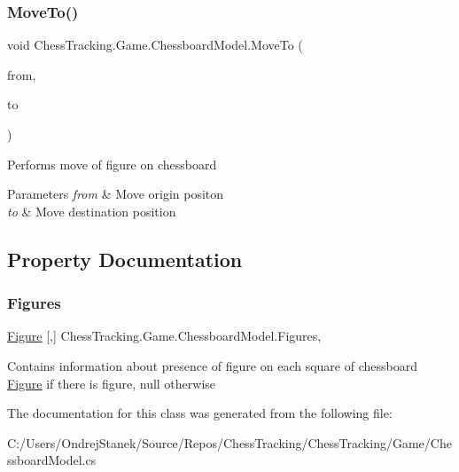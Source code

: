 \subsubsection{\texorpdfstring{MoveTo()}{MoveTo()}}
{\footnotesize\ttfamily void Chess\+Tracking.\+Game.\+Chessboard\+Model.\+Move\+To (\begin{DoxyParamCaption}\item[{\mbox{\hyperlink{class_chess_tracking_1_1_game_1_1_chess_position}{Chess\+Position}}}]{from,  }\item[{\mbox{\hyperlink{class_chess_tracking_1_1_game_1_1_chess_position}{Chess\+Position}}}]{to }\end{DoxyParamCaption})}



Performs move of figure on chessboard 


\begin{DoxyParams}{Parameters}
{\em from} & Move origin positon\\
\hline
{\em to} & Move destination position\\
\hline
\end{DoxyParams}


\subsection{Property Documentation}
\mbox{\label{class_chess_tracking_1_1_game_1_1_chessboard_model_ac653deeae3dc84b3b0470aac4c60d671}} 
\subsubsection{\texorpdfstring{Figures}{Figures}}
{\footnotesize\ttfamily \mbox{\hyperlink{class_chess_tracking_1_1_game_1_1_figure}{Figure}} \mbox{[},\mbox{]} Chess\+Tracking.\+Game.\+Chessboard\+Model.\+Figures\hspace{0.3cm}{\ttfamily [get]}, {\ttfamily [set]}}



Contains information about presence of figure on each square of chessboard \mbox{\hyperlink{class_chess_tracking_1_1_game_1_1_figure}{Figure}} if there is figure, null otherwise 



The documentation for this class was generated from the following file\+:\begin{DoxyCompactItemize}
\item 
C\+:/\+Users/\+Ondrej\+Stanek/\+Source/\+Repos/\+Chess\+Tracking/\+Chess\+Tracking/\+Game/Chessboard\+Model.\+cs\end{DoxyCompactItemize}
